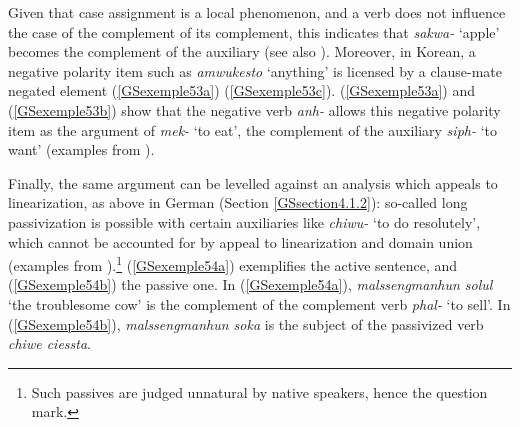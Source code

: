 {	\label{GSexemple52b}
\zl

Given that case assignment is a local phenomenon, and a verb does not influence the case of the complement of its complement, this indicates that \emph{sakwa-} `apple' becomes the complement of the auxiliary (see also \citealt{Yoo2003}). Moreover, in Korean, a negative polarity item such as \emph{amwukesto} `anything' is licensed by a clause-mate negated element (\ref{GSexemple53a}) (\ref{GSexemple53c}). (\ref{GSexemple53a}) and (\ref{GSexemple53b}) show that the negative verb \emph{anh-} allows this negative polarity item as the argument of \emph{mek-} `to eat', the complement of the auxiliary \emph{siph-} `to want' (examples from \citealt[91]{Kim2016a-u}).

\eal
	\label{GSexemple53}
	\label{GSexemple53a}
		
	\label{GSexemple53b}
	
	\label{GSexemple53c}
	
\zl

Finally, the same argument can be levelled against an analysis which appeals to linearization, as above in German (Section \ref{GSsection4.1.2}): so-called long passivization is possible with certain auxiliaries like \emph{chiwu-} `to do resolutely', which cannot be accounted for by appeal to linearization and domain union (examples from \citealt[164]{Chung98a-u}).\footnote{Such passives are judged unnatural by native speakers, hence the question mark.} (\ref{GSexemple54a}) exemplifies the active sentence, and (\ref{GSexemple54b}) the passive one. In (\ref{GSexemple54a}), \emph{malssengmanhun solul} `the troublesome cow' is the complement of the complement verb \emph{phal-} `to sell'. In (\ref{GSexemple54b}), \emph{malssengmanhun soka} is the subject of the passivized verb \emph{chiwe ciessta}.

}
